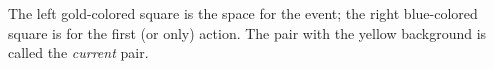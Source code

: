 The left gold-colored square is the space for the event; the right
blue-colored square is for the first (or only) action. The pair with the
yellow background is called the \emph{current} pair.


